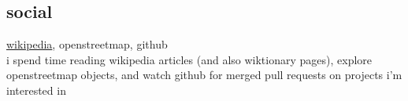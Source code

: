 \documentclass{article}
\begin{document}
\subsection{social}
\href{https://en.wikipedia.org/wiki/User:Rwp0}{wikipedia}, openstreetmap, github\\
i spend time reading wikipedia articles (and also wiktionary pages), explore openstreetmap objects, and watch github for merged pull requests on projects i'm interested in
{} %
% 
\end{document}
